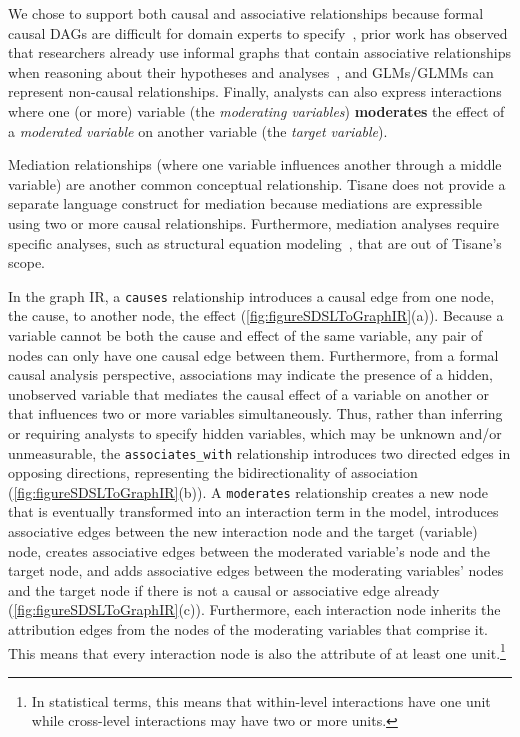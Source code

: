 We chose to support both causal and associative relationships because formal
causal DAGs are difficult for domain experts to
specify~\cite{suzuki2020causal,suzuki2018mechanisms,velentgas2013developing},
prior work has observed that researchers already use informal graphs that
contain associative relationships when reasoning about their hypotheses and
analyses~\cite{jun2021hypothesisFormalization}, and GLMs/GLMMs can represent
non-causal relationships. Finally, analysts can also express interactions where
one (or more) variable (the \textit{moderating variables}) \textbf{moderates}
the effect of a \textit{moderated variable} on another variable (the
\textit{target variable}).

\enlargethispage{-12pt}


Mediation relationships (where one variable influences another through a middle variable) are another common conceptual relationship. Tisane does
not provide a separate language construct for %
mediation because mediations are expressible using two or more causal
relationships. Furthermore, mediation analyses require specific analyses, such
as structural equation modeling~\cite{hoyle1995SEM}, that are out of Tisane's
scope.

In the graph IR, a \texttt{causes} relationship introduces a causal edge from
one node, the cause, to another node, the effect (\ref{fig:figureSDSLToGraphIR}(a)). Because a
variable cannot be both the cause and effect of the same variable, any pair of
nodes can only have one causal edge between them. Furthermore, from a formal
causal analysis perspective, associations may indicate the presence of a hidden,
unobserved variable that mediates the causal effect of a variable on another or
that influences two or more variables simultaneously. Thus, rather than
inferring or requiring analysts to specify hidden variables, which may be
unknown and/or unmeasurable, the \texttt{associates\_with} relationship introduces two directed edges in
opposing directions, representing the bidirectionality of association (\ref{fig:figureSDSLToGraphIR}(b)). A \texttt{moderates}
relationship creates a new node that is eventually transformed into an interaction term in the model, introduces associative edges between the new
interaction node and the target (variable) node, creates associative edges between the moderated variable's node and the target node, and adds associative
edges between the moderating variables' nodes and the
target node if there is not a causal or associative edge already (\ref{fig:figureSDSLToGraphIR}(c)).
Furthermore, each interaction node inherits the attribution edges from the nodes of the
\nobreak moderating variables that comprise it. This means that every interaction node is
also the attribute of
at least one unit.\footnote{In statistical terms, this
means that within-level interactions have one unit while cross-level
interactions may have two or more units.}

